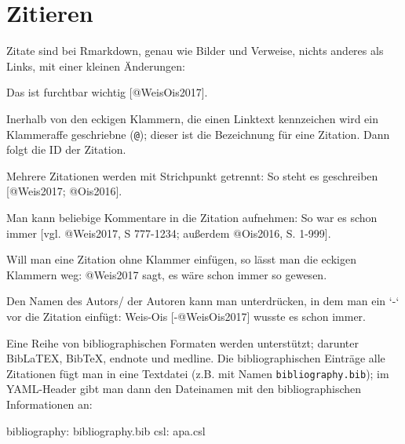 \documentclass[12pt,]{book}
\makeatletter
\newenvironment{Shaded}{\begin{snugshade}}{\end{snugshade}}
\newcommand{\BaseNTok}[1]{\textcolor[rgb]{0.00,0.00,0.81}{{#1}}}
\newcommand{\FunctionTok}[1]{\textcolor[rgb]{0.00,0.00,0.00}{{#1}}}
\newcommand{\NormalTok}[1]{{#1}}
\newenvironment{kframe}{%
\medskip{}
\setlength{\fboxsep}{.8em}
 \def\at@end@of@kframe{}%
 \ifinner\ifhmode%
  \def\at@end@of@kframe{\end{minipage}}%
  \begin{minipage}{\columnwidth}%
 \fi\fi%
 \def\FrameCommand##1{\hskip\@totalleftmargin \hskip-\fboxsep
 \colorbox{shadecolor}{##1}\hskip-\fboxsep
     \hskip-\linewidth \hskip-\@totalleftmargin \hskip\columnwidth}%
 \MakeFramed {\advance\hsize-\width
   \@totalleftmargin\z@ \linewidth\hsize
   \@setminipage}}%
 {\par\unskip\endMakeFramed%
 \at@end@of@kframe}
\renewenvironment{Shaded}{\begin{kframe}}{\end{kframe}}
\makeatother
\begin{document}
\section{Zitieren}\label{zitieren}

Zitate sind bei Rmarkdown, genau wie Bilder und Verweise, nichts anderes
als Links, mit einer kleinen Änderungen:

\begin{Shaded}
\begin{Highlighting}[]
\NormalTok{Das ist furchtbar wichtig [@WeisOis2017]. }
\end{Highlighting}
\end{Shaded}

Inerhalb von den eckigen Klammern, die einen Linktext kennzeichen wird
ein Klammeraffe geschriebne (\texttt{@}); dieser ist die Bezeichnung für
eine Zitation. Dann folgt die ID der Zitation.

\begin{Shaded}
\begin{Highlighting}[]
\NormalTok{Mehrere Zitationen werden mit Strichpunkt getrennt: So steht es geschreiben [@Weis2017; @Ois2016].}

\NormalTok{Man kann beliebige Kommentare in die Zitation aufnehmen: So war es schon immer [vgl. @Weis2017, S 777-1234; außerdem @Ois2016, S. 1-999].}

\NormalTok{Will man eine Zitation ohne Klammer einfügen, so lässt man die eckigen Klammern weg: @Weis2017 sagt, es wäre schon immer so gewesen.}

\NormalTok{Den Namen des Autors/ der Autoren kann man unterdrücken, in dem man ein }\BaseNTok{`-`} \NormalTok{vor die Zitation einfügt: Weis-Ois [-@WeisOis2017] wusste es schon immer.}
\end{Highlighting}
\end{Shaded}

Eine Reihe von bibliographischen Formaten werden unterstützt; darunter
BibLaTEX, BibTeX, endnote und medline. Die bibliographischen Einträge
alle Zitationen fügt man in eine Textdatei (z.B. mit Namen
\texttt{bibliography.bib}); im YAML-Header gibt man dann den Dateinamen
mit den bibliographischen Informationen an:

\begin{Shaded}
\begin{Highlighting}[]
\FunctionTok{bibliography:} \NormalTok{bibliography.bib}
\FunctionTok{csl:} \NormalTok{apa.csl}
\end{Highlighting}
\end{Shaded}
\end{document}
